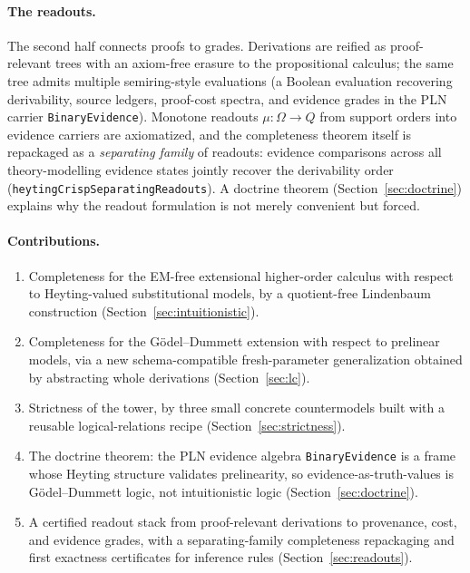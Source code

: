 \documentclass[11pt]{article}
\newcommand{\code}[1]{\texttt{#1}}
\newcommand{\BE}{\code{BinaryEvidence}}
\theoremstyle{plain}
\theoremstyle{definition}
\begin{document}
\paragraph{The readouts.}  The second half connects proofs to grades.
Derivations are reified as proof-relevant trees with an axiom-free erasure to
the propositional calculus; the same tree admits multiple semiring-style
evaluations (a Boolean evaluation recovering derivability, source ledgers,
proof-cost spectra, and evidence grades in the PLN carrier \BE{}).  Monotone
readouts $\mu:\Omega\to Q$ from support orders into evidence carriers are
axiomatized, and the completeness theorem itself is repackaged as a
\emph{separating family} of readouts: evidence comparisons across all
theory-modelling evidence states jointly recover the derivability order
(\code{heytingCrispSeparatingReadouts}).  A doctrine theorem
(Section~\ref{sec:doctrine}) explains why the readout formulation is not
merely convenient but forced.

\paragraph{Contributions.}
\begin{enumerate}
\item Completeness for the EM-free extensional higher-order calculus with
  respect to Heyting-valued substitutional models, by a quotient-free
  Lindenbaum construction (Section~\ref{sec:intuitionistic}).
\item Completeness for the G\"odel--Dummett extension with respect to
  prelinear models, via a new schema-compatible fresh-parameter
  generalization obtained by abstracting whole derivations
  (Section~\ref{sec:lc}).
\item Strictness of the tower, by three small concrete countermodels built
  with a reusable logical-relations recipe (Section~\ref{sec:strictness}).
\item The doctrine theorem: the PLN evidence algebra \BE{} is a frame whose
  Heyting structure validates prelinearity, so evidence-as-truth-values is
  G\"odel--Dummett logic, not intuitionistic logic
  (Section~\ref{sec:doctrine}).
\item A certified readout stack from proof-relevant derivations to
  provenance, cost, and evidence grades, with a separating-family
  completeness repackaging and first exactness certificates for inference
  rules (Section~\ref{sec:readouts}).
\end{enumerate}
\end{document}
